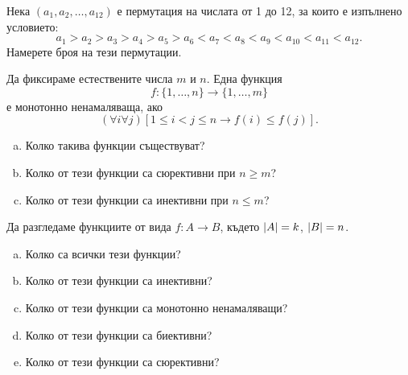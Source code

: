 \begin{problem}
  Нека $(a_1,a_2,\dots,a_{12})$ е пермутация на числата от 1 до 12, за които е изпълнено условието:
  \[a_1 > a_2 > a_3 > a_4 > a_5 > a_6 < a_7 < a_8 < a_9 < a_{10} < a_{11} < a_{12}.\]
  Намерете броя на тези пермутации.  
\end{problem}

\begin{problem}
  Да фиксираме естествените числа $m$ и $n$.
  Една функция \[f:\{1,\dots,n\}\to\{1,\dots,m\}\] е монотонно ненамаляваща, ако
  \[(\forall i\forall j)[1\leq i<j\leq n \rightarrow f(i)\leq f(j)].\]
  \begin{enumerate}[a)]
  \item
    Колко такива функции съществуват?
  \item
    Колко от тези функции са сюрективни при $n\geq m$?
  \item
    Колко от тези функции са инективни при $n\leq m$?
  \end{enumerate}
\end{problem}

\begin{problem}
  Да разгледаме функциите от вида $f:A\to B$,
  където $\lvert{A}\rvert = k$, $\lvert{B}\rvert = n$.
  \begin{enumerate}[a)]
  \item 
    Колко са всички тези функции?
  \item
    Колко от тези функции са инективни?
  \item
    Колко от тези функции са монотонно ненамаляващи?
  \item
    Колко от тези функции са биективни?
  \item
    Колко от тези функции са сюрективни?
  \end{enumerate}
\end{problem}


